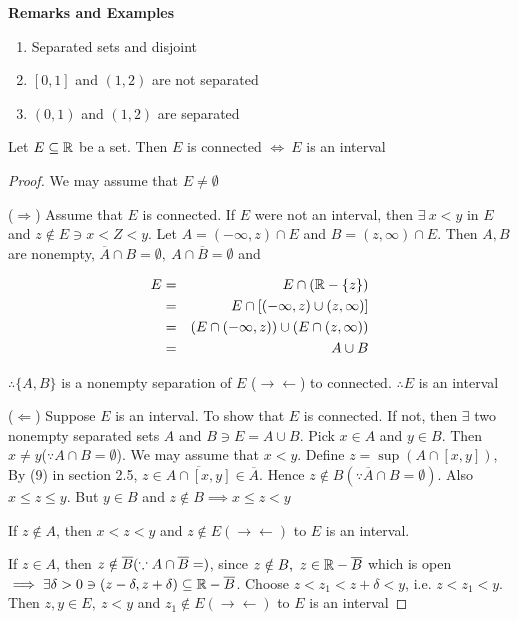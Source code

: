 \textbf{Remarks and Examples}

\begin{enumerate}[wide]
	\item Separated sets and disjoint
	\item $[0,1]$ and $(1,2)$ are not separated
	\item $(0,1)$ and $(1,2)$ are separated
\end{enumerate}

\begin{thm}
	Let $E \subseteq \mathbb{R}$ be a set. Then $E$ is connected $\Leftrightarrow ~E$ is an interval
\end{thm}

\begin{proof}
	We may assume that $E \neq \emptyset$
	
	($\Rightarrow$) Assume that $E$ is connected. If $E$ were not an interval, then $\exists ~x < y $ in $E$ and $z \notin E \ni x < Z < y$. Let $A = (-\infty , z) \cap E$ and $B = (z , \infty) \cap E$. Then $A,B$ are nonempty, $\overline{A} \cap B = \emptyset , ~A \cap \overline{B} = \emptyset$ and 
	
	\begin{eqnarray*}
		E &=& E \cap (\mathbb{R} - \{z\})\\
		&=& E \cap [(-\infty,z) \cup (z,\infty)]\\
		&=& (E \cap (-\infty,z)) \cup (E \cap (z,\infty))\\
		&=& A \cup B
	\end{eqnarray*}
	
	$\therefore \{A,B\}$ is a nonempty separation of $E$ ($\rightarrow\leftarrow$) to connected. $\therefore E$ is an interval
	
	($\Leftarrow$) Suppose $E$ is an interval. To show that $E$ is connected. If not, then $\exists$ two nonempty separated sets $A$ and $B \ni E = A \cup B$. Pick $x \in A$ and $y \in B$. Then $x \neq y$($\because A \cap B = \emptyset$). We may assume that $x < y$. Define $z = \sup (A \cap [x,y])$, By (9) in section 2.5, $z \in \overline{A \cap [x,y]} \in \overline{A}$. Hence $z \notin B(\because \overline{A} \cap B = \emptyset)$. Also $x \leq z \leq y$. But $y \in B$ and $z \notin B \implies x \leq z < y$
	
	If $z \notin A$, then $x < z < y$ and $z \notin E (\rightarrow\leftarrow)$ to $E$ is an interval.
	
	If $z \in A$, then $z \notin \overline{B}(\because A \cap \overline{B} = \empty)$, since $z \notin B,~z \in \mathbb{R} - \overline{B}$ which is open $\implies \exists \delta > 0 \ni (z - \delta , z+\delta) \subseteq \mathbb{R} - \overline{B}$. Choose $z < z_1 < z + \delta < y$, i.e. $z < z_1 < y$. Then $z,y \in E,~z < y$ and $z_1 \notin E (\rightarrow\leftarrow)$ to $E$ is an interval
\end{proof}


